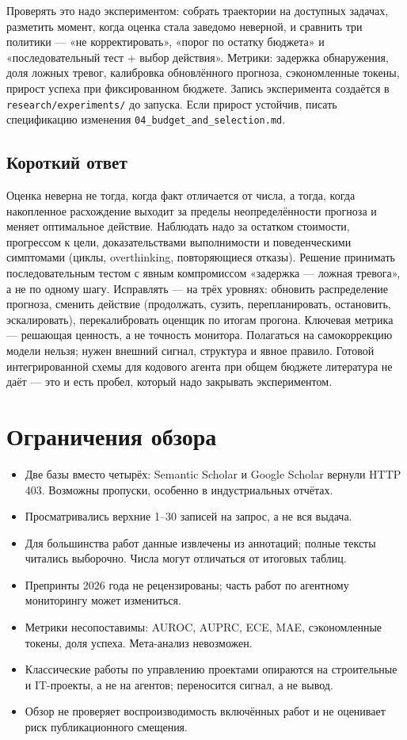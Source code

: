 \documentclass[11pt,a4paper]{article}
\begin{document}
Проверять это надо экспериментом: собрать траектории на доступных задачах,
разметить момент, когда оценка стала заведомо неверной, и сравнить три
политики — «не корректировать», «порог по остатку бюджета» и
«последовательный тест + выбор действия». Метрики: задержка обнаружения,
доля ложных тревог, калибровка обновлённого прогноза, сэкономленные токены,
прирост успеха при фиксированном бюджете. Запись эксперимента создаётся в
\texttt{research/experiments/} до запуска. Если прирост устойчив, писать
спецификацию изменения \texttt{04\_budget\_and\_selection.md}.

\subsection{Короткий ответ}

Оценка неверна не тогда, когда факт отличается от числа, а тогда, когда
накопленное расхождение выходит за пределы неопределённости прогноза и
меняет оптимальное действие. Наблюдать надо за остатком стоимости,
прогрессом к цели, доказательствами выполнимости и поведенческими
симптомами (циклы, overthinking, повторяющиеся отказы). Решение принимать
последовательным тестом с явным компромиссом «задержка — ложная тревога»,
а не по одному шагу. Исправлять — на трёх уровнях: обновить распределение
прогноза, сменить действие (продолжать, сузить, перепланировать,
остановить, эскалировать), перекалибровать оценщик по итогам прогона.
Ключевая метрика — решающая ценность, а не точность монитора. Полагаться
на самокоррекцию модели нельзя; нужен внешний сигнал, структура и явное
правило. Готовой интегрированной схемы для кодового агента при общем
бюджете литература не даёт — это и есть пробел, который надо закрывать
экспериментом.

\section{Ограничения обзора}

\begin{itemize}
  \item Две базы вместо четырёх: Semantic Scholar и Google Scholar вернули
        HTTP 403. Возможны пропуски, особенно в индустриальных отчётах.
  \item Просматривались верхние 1--30 записей на запрос, а не вся выдача.
  \item Для большинства работ данные извлечены из аннотаций; полные тексты
        читались выборочно. Числа могут отличаться от итоговых таблиц.
  \item Препринты 2026 года не рецензированы; часть работ по агентному
        мониторингу может измениться.
  \item Метрики несопоставимы: AUROC, AUPRC, ECE, MAE, сэкономленные
        токены, доля успеха. Мета-анализ невозможен.
  \item Классические работы по управлению проектами опираются на
        строительные и IT-проекты, а не на агентов; переносится сигнал, а
        не вывод.
  \item Обзор не проверяет воспроизводимость включённых работ и не
        оценивает риск публикационного смещения.
\end{itemize}



\end{document}
